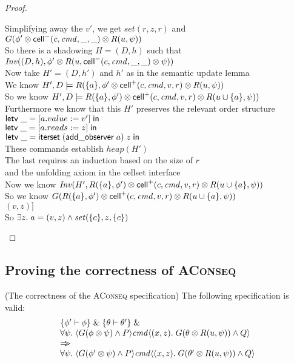\begin{proof}
\begin{tabbedproof}
\ooo Simplifying away the $v'$, we get $\mathit{set}(r, z, r)$ and $G(\phi' \otimes \mathsf{cell}^{-}({c}, {\mathit{cmd}}, {\_}, {\_}) \otimes R(u, \psi))$ \\
\ooo So there is a shadowing $H = (D,h)$ such that $\mathit{Inv}((D, h), \phi' \otimes R(u, \mathsf{cell}^{-}({c}, {\mathit{cmd}}, {\_}, {\_}) \otimes \psi))$ \\
\ooo Now take $H' = (D,h')$ and $h'$ as in the semantic update lemma \\
\ooo We know $H', D \models R(\{{a}\}, \phi' \otimes \mathsf{cell}^{+}({c}, {\mathit{cmd}}, {v}, {r}) \otimes R(u, \psi))$\\
\ooo So we know $H', D \models R(\{{a}\}, \phi') \otimes \mathsf{cell}^{+}({c}, {\mathit{cmd}}, {v}, {r}) \otimes R(u \cup \{{a}\}, \psi))$ \\
\ooo Furthermore we know that this $H'$ preserves the relevant order structure \\
\ooo $\mathsf{letv}\;\_ = [a.value := v']\;\mathsf{in}\;$ \\
\ooo $\mathsf{letv}\;\_ = [a.reads := z]\;\mathsf{in}\;$ \\
\ooo $\mathsf{letv}\;\_ = \mathsf{iterset}\;(\mathsf{add\_observer}\;a)\;z\;\mathsf{in}\;$ \\
\ooo These commands establish $\mathit{heap}(H')$ \\
\ooo The last requires an induction based on the size of $r$ \\ 
\oox and the unfolding axiom in the cellset interface \\
\ooo Now we know $\mathit{Inv}(H', R(\{{a}\}, \phi') \otimes \mathsf{cell}^{+}({c}, {\mathit{cmd}}, {v}, {r}) \otimes R(u \cup \{{a}\}, \psi))$ \\
\ooo So we know $G(R(\{{a}\}, \phi') \otimes \mathsf{cell}^{+}({c}, {\mathit{cmd}}, {v}, {r}) \otimes R(u \cup \{{a}\}, \psi))$ \\
\ooo $(v, z)]$ \\
\ooo So $\exists z.\;a = (v,z) \land \mathit{set}(\{{c}\}, z, \{{c}\})$ 
\end{tabbedproof}
\end{proof}

\subsection{Proving the correctness of \textsc{AConseq}}

\begin{prop*}{(The correctness of the \textsc{AConseq} specification)}
The following specification is valid:
\begin{displaymath}
\begin{array}{l}
\{{\phi' \vdash \phi}\} \;\&\; \{{\theta \vdash \theta'}\} \;\&\; \\
\forall \psi.\; \langle{G(\phi \otimes \psi) \land P}\rangle{\mathit{cmd}}\langle{(x,z)}.\;{G(\theta\otimes R(u, \psi)) \land Q}\rangle \\
\Rightarrow\!\!\!> \\
\forall \psi.\; \langle{G(\phi' \otimes \psi) \land P}\rangle{\mathit{cmd}}\langle{(x,z)}.\;{G(\theta'\otimes R(u, \psi)) \land Q}\rangle  \\
\end{array}
\end{displaymath}
\end{prop*}


